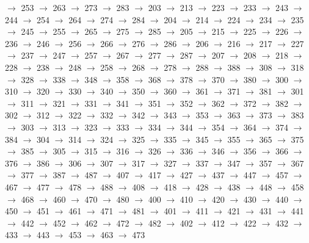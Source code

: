 $\rightarrow$ 253 $\rightarrow$ 263 $\rightarrow$ 273 $\rightarrow$ 283 $\rightarrow$ 203 $\rightarrow$ 213 $\rightarrow$ 223 $\rightarrow$ 233 $\rightarrow$ 243 $\rightarrow$ 244 $\rightarrow$ 254 $\rightarrow$ 264 $\rightarrow$ 274 $\rightarrow$ 284 $\rightarrow$ 204 $\rightarrow$ 214 $\rightarrow$ 224 $\rightarrow$ 234 $\rightarrow$ 235 $\rightarrow$ 245 $\rightarrow$ 255 $\rightarrow$ 265 $\rightarrow$ 275 $\rightarrow$ 285 $\rightarrow$ 205 $\rightarrow$ 215 $\rightarrow$ 225 $\rightarrow$ 226 $\rightarrow$ 236 $\rightarrow$ 246 $\rightarrow$ 256 $\rightarrow$ 266 $\rightarrow$ 276 $\rightarrow$ 286 $\rightarrow$ 206 $\rightarrow$ 216 $\rightarrow$ 217 $\rightarrow$ 227 $\rightarrow$ 237 $\rightarrow$ 247 $\rightarrow$ 257 $\rightarrow$ 267 $\rightarrow$ 277 $\rightarrow$ 287 $\rightarrow$ 207 $\rightarrow$ 208 $\rightarrow$ 218 $\rightarrow$ 228 $\rightarrow$ 238 $\rightarrow$ 248 $\rightarrow$ 258 $\rightarrow$ 268 $\rightarrow$ 278 $\rightarrow$ 288 $\rightarrow$ 388 $\rightarrow$ 308 $\rightarrow$ 318 $\rightarrow$ 328 $\rightarrow$ 338 $\rightarrow$ 348 $\rightarrow$ 358 $\rightarrow$ 368 $\rightarrow$ 378 $\rightarrow$ 370 $\rightarrow$ 380 $\rightarrow$ 300 $\rightarrow$ 310 $\rightarrow$ 320 $\rightarrow$ 330 $\rightarrow$ 340 $\rightarrow$ 350 $\rightarrow$ 360 $\rightarrow$ 361 $\rightarrow$ 371 $\rightarrow$ 381 $\rightarrow$ 301 $\rightarrow$ 311 $\rightarrow$ 321 $\rightarrow$ 331 $\rightarrow$ 341 $\rightarrow$ 351 $\rightarrow$ 352 $\rightarrow$ 362 $\rightarrow$ 372 $\rightarrow$ 382 $\rightarrow$ 302 $\rightarrow$ 312 $\rightarrow$ 322 $\rightarrow$ 332 $\rightarrow$ 342 $\rightarrow$ 343 $\rightarrow$ 353 $\rightarrow$ 363 $\rightarrow$ 373 $\rightarrow$ 383 $\rightarrow$ 303 $\rightarrow$ 313 $\rightarrow$ 323 $\rightarrow$ 333 $\rightarrow$ 334 $\rightarrow$ 344 $\rightarrow$ 354 $\rightarrow$ 364 $\rightarrow$ 374 $\rightarrow$ 384 $\rightarrow$ 304 $\rightarrow$ 314 $\rightarrow$ 324 $\rightarrow$ 325 $\rightarrow$ 335 $\rightarrow$ 345 $\rightarrow$ 355 $\rightarrow$ 365 $\rightarrow$ 375 $\rightarrow$ 385 $\rightarrow$ 305 $\rightarrow$ 315 $\rightarrow$ 316 $\rightarrow$ 326 $\rightarrow$ 336 $\rightarrow$ 346 $\rightarrow$ 356 $\rightarrow$ 366 $\rightarrow$ 376 $\rightarrow$ 386 $\rightarrow$ 306 $\rightarrow$ 307 $\rightarrow$ 317 $\rightarrow$ 327 $\rightarrow$ 337 $\rightarrow$ 347 $\rightarrow$ 357 $\rightarrow$ 367 $\rightarrow$ 377 $\rightarrow$ 387 $\rightarrow$ 487 $\rightarrow$ 407 $\rightarrow$ 417 $\rightarrow$ 427 $\rightarrow$ 437 $\rightarrow$ 447 $\rightarrow$ 457 $\rightarrow$ 467 $\rightarrow$ 477 $\rightarrow$ 478 $\rightarrow$ 488 $\rightarrow$ 408 $\rightarrow$ 418 $\rightarrow$ 428 $\rightarrow$ 438 $\rightarrow$ 448 $\rightarrow$ 458 $\rightarrow$ 468 $\rightarrow$ 460 $\rightarrow$ 470 $\rightarrow$ 480 $\rightarrow$ 400 $\rightarrow$ 410 $\rightarrow$ 420 $\rightarrow$ 430 $\rightarrow$ 440 $\rightarrow$ 450 $\rightarrow$ 451 $\rightarrow$ 461 $\rightarrow$ 471 $\rightarrow$ 481 $\rightarrow$ 401 $\rightarrow$ 411 $\rightarrow$ 421 $\rightarrow$ 431 $\rightarrow$ 441 $\rightarrow$ 442 $\rightarrow$ 452 $\rightarrow$ 462 $\rightarrow$ 472 $\rightarrow$ 482 $\rightarrow$ 402 $\rightarrow$ 412 $\rightarrow$ 422 $\rightarrow$ 432 $\rightarrow$ 433 $\rightarrow$ 443 $\rightarrow$ 453 $\rightarrow$ 463 $\rightarrow$ 473 